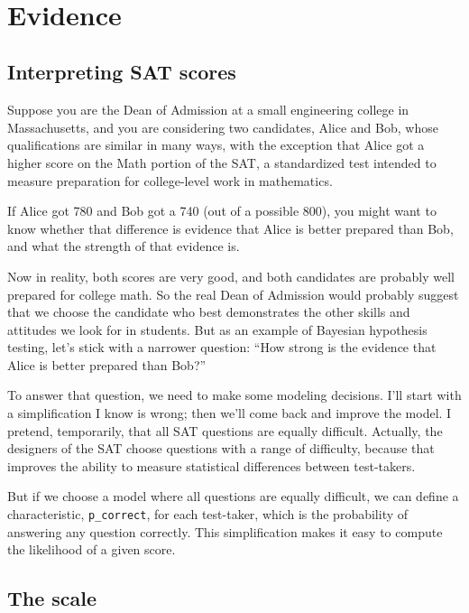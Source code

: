 \documentclass[12pt]{book}
\theoremstyle{exercise}
\begin{document}
\

\chapter{Evidence}
\label{evidence}

\section{Interpreting SAT scores}

Suppose you are the Dean of Admission at a small engineering
college in Massachusetts, and you are considering two candidates,
Alice and Bob, whose qualifications are similar in many ways,
with the exception that Alice got a higher score on the Math
portion of the SAT, a standardized test intended to measure
preparation for college-level work in mathematics.

If Alice got 780 and Bob got a 740 (out of a possible 800), you might
want to know whether that difference is evidence that Alice is better
prepared than Bob, and what the strength of that evidence is.

Now in reality, both scores are very good, and both 
candidates are probably well prepared for college math.  So
the real Dean of Admission would probably suggest that we choose
the candidate who best demonstrates the other skills and
attitudes we look for in students.  But as an example of
Bayesian hypothesis testing, let's stick with a narrower question:
``How strong is the evidence that Alice is better prepared
than Bob?''

To answer that question, we need to make some modeling decisions.
I'll start with a simplification I know is wrong; then we'll come back
and improve the model.  I pretend, temporarily, that
all SAT questions are equally difficult.  Actually, the designers of
the SAT choose questions with a range of difficulty, because that
improves the ability to measure statistical differences between
test-takers.

But if we choose a model where all questions are equally difficult, we
can define a characteristic, \verb"p_correct", for each test-taker,
which is the probability of answering any question correctly.  This
simplification makes it easy to compute the likelihood of a given
score.


\section{The scale}
\end{document}
